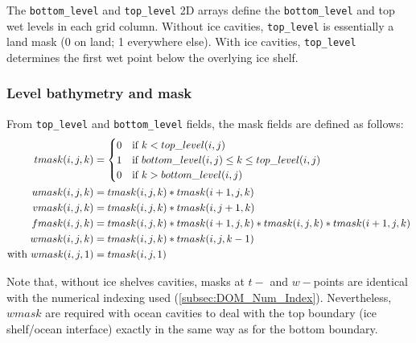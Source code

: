\documentclass[../main/NEMO_manual]{subfiles}
\begin{document}
The \texttt{bottom\_level} and \texttt{top\_level} 2D arrays define
the \texttt{bottom\_level} and top wet levels in each grid column.
Without ice cavities, \texttt{top\_level} is essentially a land mask (0 on land; 1 everywhere else).
With ice cavities, \texttt{top\_level} determines the first wet point below the overlying ice shelf.

\subsubsection{Level bathymetry and mask}
\label{subsec:DOM_msk}

From \texttt{top\_level} and \texttt{bottom\_level} fields, the mask fields are defined as follows:
\begin{align*}
  tmask(i,j,k) &=
  \begin{cases}
    0 &\text{if $                             k <    top\_level(i,j)$} \\
    1 &\text{if $     bottom\_level(i,j) \leq k \leq top\_level(i,j)$} \\
    0 &\text{if $k >  bottom\_level(i,j)                            $}
  \end{cases} \\
  umask(i,j,k) &= tmask(i,j,k) * tmask(i + 1,j,    k) \\
  vmask(i,j,k) &= tmask(i,j,k) * tmask(i    ,j + 1,k) \\
  fmask(i,j,k) &= tmask(i,j,k) * tmask(i + 1,j,    k) * tmask(i,j,k) * tmask(i + 1,j,    k) \\
  wmask(i,j,k) &= tmask(i,j,k) * tmask(i    ,j,k - 1) \\
  \text{with~} wmask(i,j,1) &= tmask(i,j,1)
\end{align*}

Note that, without ice shelves cavities,
masks at $t-$ and $w-$points are identical with the numerical indexing used
(\autoref{subsec:DOM_Num_Index}).
Nevertheless,
$wmask$ are required with ocean cavities to deal with the top boundary (ice shelf/ocean interface)
exactly in the same way as for the bottom boundary.

\end{document}
